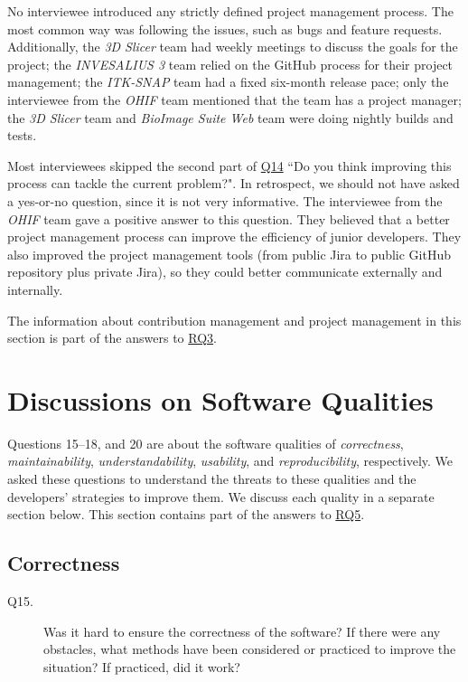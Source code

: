 No interviewee introduced any strictly defined project management process. The most common way was following the issues, such as bugs and feature requests. Additionally, the \textit{3D Slicer} team had weekly meetings to discuss the goals for the project; the \textit{INVESALIUS 3} team relied on the GitHub process for their project management; the \textit{ITK-SNAP} team had a fixed six-month release pace; only the interviewee from the \textit{OHIF} team mentioned that the team has a project manager; the \textit{3D Slicer} team and \textit{BioImage Suite Web} team were doing nightly builds and tests.

Most interviewees skipped the second part of \hyperlink{q14}{Q14} ``Do you think improving this process can tackle the current problem?". In retrospect, we should not have asked a yes-or-no question, since it is not very informative. The interviewee from the \textit{OHIF} team gave a positive answer to this question. They believed that a better project management process can improve the efficiency of junior developers. They also improved the project management tools (from public Jira to public GitHub repository plus private Jira), so they could better communicate externally and internally.

The information about contribution management and project management in this section is part of the answers to \hyperlink{rq3}{RQ3}.

\section{Discussions on Software Qualities}
\label{sec_interview_software_qualities}
Questions 15--18, and 20 are about the software qualities of \textit{correctness}, \textit{maintainability}, \textit{understandability}, \textit{usability}, and \textit{reproducibility}, respectively. We asked these questions to understand the threats to these qualities and the developers' strategies to improve them. We discuss each quality in a separate section below. This section contains part of the answers to \hyperlink{rq5}{RQ5}.

\subsection{Correctness}
\label{sec_interview_correctness}
\begin{description}
\item[Q15.] Was it hard to ensure the correctness of the software? If there were any obstacles, what methods have been considered or practiced to improve the situation? If practiced, did it work?
\end{description}

